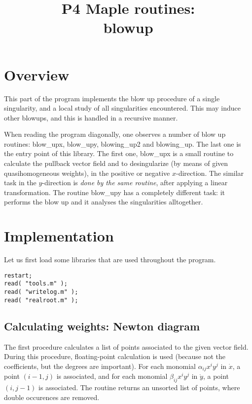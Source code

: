 \documentclass[a4paper,10pt]{article}
\title{P4 Maple routines:\\blowup}
\author{}
\date{}
\begin{document}
\maketitle

\section{Overview}

This part of the program implements the blow up procedure of a single singularity, and a local
study of all singularities encountered.  This may induce other blowups, and this is handled
in a recursive manner.

When reading the program diagonally, one observes a number of blow up routines: blow\_upx, blow\_upy,
blowing\_up2 and blowing\_up.  The last one is the entry point of this library.  The first one, blow\_upx
is a small routine to calculate the pullback vector field and to desingularize (by means of given
quasihomogeneous weights), in the positive or negative $x$-direction.  The similar task in the $y$-direction
is \emph{done by the same routine}, after applying a linear transformation.  The routine blow\_upy has
a completely different task: it performs the blow up and it analyses the singularities alltogether.

\section{Implementation}

Let us first load some libraries that are used throughout the program.

\begin{lstlisting}[name=blowup]
restart;
read( "tools.m" );
read( "writelog.m" );
read( "realroot.m" );
\end{lstlisting}

\subsection{Calculating weights: Newton diagram}

The first procedure calculates a list of points associated to the given vector field. During this procedure,
floating-point calculation is used (because not the coefficients, but the degrees are important).  For each
monomial $\alpha_{ij}x^iy^j$ in $\dot{x}$, a point $(i-1,j)$ is associated, and for each monomial
$\beta_{ij}x^iy^j$ in $\dot{y}$, a point $(i,j-1)$ is associated. The routine returns an unsorted list of points,
where double occurences are removed.
\end{document}
